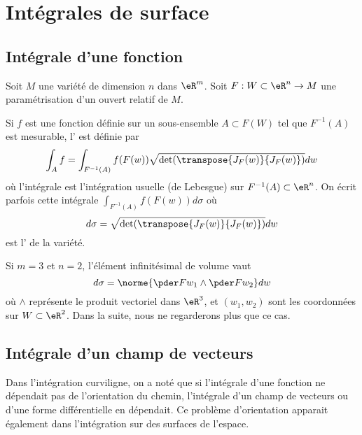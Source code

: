 \section{Intégrales de surface}

\subsection{Intégrale d'une fonction}
\label{secintsurfaciques}
Soit $M$ une variété de dimension $n$ dans $\eR^m$. Soit $F : W \subset \eR^n \to M$ une paramétrisation d'un ouvert relatif de $M$.  

Si $f$ est une fonction définie sur un sous-ensemble $A \subset F(W)$ tel que $F^{-1}(A)$ est mesurable, l' est définie par
\begin{equation*}
  \int_A f = \int_{F^{-1}(A)} f(F(w)) \sqrt{\det(\transpose{J_F(w)} {J_F(w)})} dw
\end{equation*}
où l'intégrale est l'intégration usuelle (de Lebesgue) sur $F^{-1}(A) \subset \eR^n$. On écrit parfois cette intégrale $\int_{F^{-1}(A)} f(F(w)) d\sigma$ où
\begin{equation*}
  d\sigma = \sqrt{\det(\transpose{J_F(w)} {J_F(w)})} dw
\end{equation*}
est l' de la variété. 

Si $m = 3$ et $n = 2$, l'élément infinitésimal de volume vaut
\begin{equation*}
  d \sigma = \norme{\pder F {w_1} \wedge \pder F {w_2}} dw
\end{equation*}
où $\wedge$ représente le produit vectoriel dans $\eR^3$, et $(w_1,w_2)$ sont les coordonnées sur $W \subset \eR^2$. Dans la suite, nous ne regarderons plus que ce cas.

\subsection{Intégrale d'un champ de vecteurs}
Dans l'intégration curviligne, on a noté que si l'intégrale d'une fonction ne dépendait pas de l'orientation du chemin, l'intégrale d'un champ de vecteurs ou d'une forme différentielle en dépendait. Ce problème d'orientation apparait également dans l'intégration sur des surfaces de l'espace.

